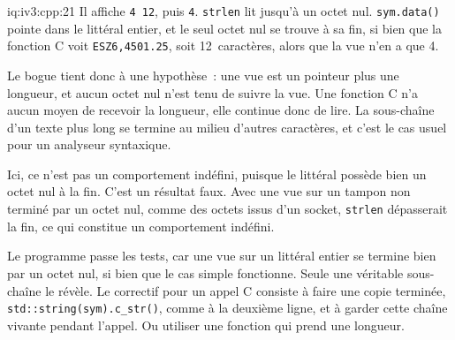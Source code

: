 \begin{solution}{iq:iv3:cpp:21}
Il affiche \texttt{4 12}, puis \texttt{4}. \texttt{strlen} lit jusqu'à un octet nul. \texttt{sym.data()} pointe dans le littéral entier, et le seul octet nul se trouve à sa fin, si bien que la fonction C voit \texttt{ESZ6,4501.25}, soit 12~caractères, alors que la vue n'en a que 4.

Le bogue tient donc à une hypothèse~: une vue est un pointeur plus une longueur, et aucun octet nul n'est tenu de suivre la vue. Une fonction C n'a aucun moyen de recevoir la longueur, elle continue donc de lire. La sous-chaîne d'un texte plus long se termine au milieu d'autres caractères, et c'est le cas usuel pour un analyseur syntaxique.

Ici, ce n'est pas un comportement indéfini, puisque le littéral possède bien un octet nul à la fin. C'est un résultat faux. Avec une vue sur un tampon non terminé par un octet nul, comme des octets issus d'un socket, \texttt{strlen} dépasserait la fin, ce qui constitue un comportement indéfini.

Le programme passe les tests, car une vue sur un littéral entier se termine bien par un octet nul, si bien que le cas simple fonctionne. Seule une véritable sous-chaîne le révèle. Le correctif pour un appel C consiste à faire une copie terminée, \texttt{std::string(sym).c\_str()}, comme à la deuxième ligne, et à garder cette chaîne vivante pendant l'appel. Ou utiliser une fonction qui prend une longueur.

\end{solution}

